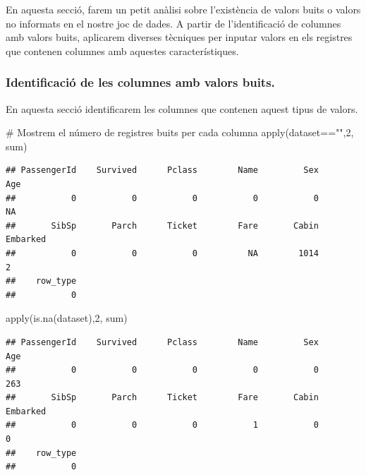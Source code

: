 \documentclass[
]{article}
\newenvironment{Shaded}{\begin{snugshade}}{\end{snugshade}}
\newcommand{\CommentTok}[1]{\textcolor[rgb]{0.50,0.62,0.50}{#1}}
\newcommand{\DecValTok}[1]{\textcolor[rgb]{0.86,0.86,0.80}{#1}}
\newcommand{\FunctionTok}[1]{\textcolor[rgb]{0.94,0.94,0.56}{#1}}
\newcommand{\NormalTok}[1]{\textcolor[rgb]{0.80,0.80,0.80}{#1}}
\newcommand{\SpecialCharTok}[1]{\textcolor[rgb]{0.86,0.64,0.64}{#1}}
\newcommand{\StringTok}[1]{\textcolor[rgb]{0.80,0.58,0.58}{#1}}
\begin{document}
En aquesta secció, farem un petit anàlisi sobre l'existència de valors
buits o valors no informats en el nostre joc de dades. A partir de
l'identificació de columnes amb valors buits, aplicarem diverses
tècniques per inputar valors en els registres que contenen columnes amb
aquestes característiques.

\hypertarget{identificaciuxf3-de-les-columnes-amb-valors-buits.}{%
\subsubsection{Identificació de les columnes amb valors
buits.}\label{identificaciuxf3-de-les-columnes-amb-valors-buits.}}

En aquesta secció identificarem les columnes que contenen aquest tipus
de valors.

\begin{Shaded}
\begin{Highlighting}[]
\CommentTok{\# Mostrem el número de registres buits per cada columna }
\FunctionTok{apply}\NormalTok{(dataset}\SpecialCharTok{==}\StringTok{""}\NormalTok{,}\DecValTok{2}\NormalTok{, sum)}
\end{Highlighting}
\end{Shaded}

\begin{verbatim}
## PassengerId    Survived      Pclass        Name         Sex         Age 
##           0           0           0           0           0          NA 
##       SibSp       Parch      Ticket        Fare       Cabin    Embarked 
##           0           0           0          NA        1014           2 
##    row_type 
##           0
\end{verbatim}

\begin{Shaded}
\begin{Highlighting}[]
\FunctionTok{apply}\NormalTok{(}\FunctionTok{is.na}\NormalTok{(dataset),}\DecValTok{2}\NormalTok{, sum)}
\end{Highlighting}
\end{Shaded}

\begin{verbatim}
## PassengerId    Survived      Pclass        Name         Sex         Age 
##           0           0           0           0           0         263 
##       SibSp       Parch      Ticket        Fare       Cabin    Embarked 
##           0           0           0           1           0           0 
##    row_type 
##           0
\end{verbatim}
\end{document}
